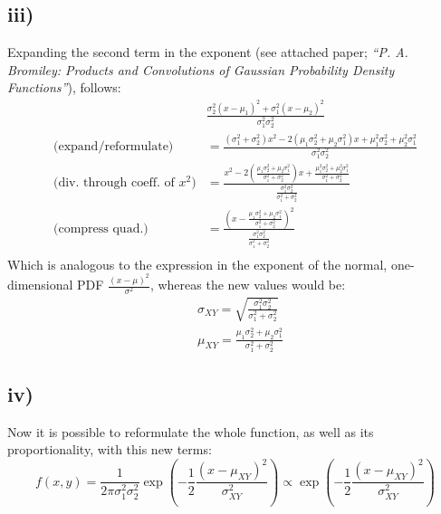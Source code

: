 \documentclass[11pt]{scrartcl} %
\begin{document}
         \subsection*{iii)}
         Expanding the second term in the exponent (see attached paper; {\it``P. A. Bromiley: Products and Convolutions of Gaussian Probability Density Functions''}), follows:
         \begin{equation}\label{eq:2}
           \begin{split}
             &\frac{\sigma_2^2(x-\mu_1)^2+\sigma_1^2(x-\mu_2)^2}{\sigma_1^2\sigma_2^2}\\
             \text{(expand/reformulate)}&=\frac{(\sigma_1^2+\sigma_2^2)x^2 -2(\mu_1\sigma_2^2+\mu_2\sigma_1^2)x+\mu_1^2\sigma_2^2+\mu_2^2\sigma_1^2}{\sigma_1^2\sigma_2^2}\\
             \text{(div. through coeff. of }x^2)&= \frac{x^2 -2(\frac{\mu_1\sigma_2^2+\mu_2\sigma_1^2}{\sigma_1^2+\sigma_2^2})x+\frac{\mu_1^2\sigma_2^2+\mu_2^2\sigma_1^2}{\sigma_1^2+\sigma_2^2}}{\frac{\sigma_1^2\sigma_2^2}{\sigma_1^2+\sigma_2^2}}\\
             \text{(compress quad.)}&= \frac{(x - \frac{\mu_1\sigma_2^2+\mu_2\sigma_1^2}{\sigma_1^2+\sigma_2^2})^2}{\frac{\sigma_1^2\sigma_2^2}{\sigma_1^2+\sigma_2^2}}\\
           \end{split}
         \end{equation}
         Which is analogous to the expression in the exponent of the normal, one-dimensional PDF \(\frac{(x-\mu)^2}{\sigma^2}\), whereas the new values would be:
         \begin{equation}\label{eq:2}
           \begin{split}
             &\sigma_{XY} = \sqrt{\frac{\sigma_1^2\sigma_2^2}{\sigma_1^2+\sigma_2^2}}\\
             &\mu_{XY} = \frac{\mu_1\sigma_2^2+\mu_2\sigma_1^2}{\sigma_1^2+\sigma_2^2}
           \end{split}
         \end{equation}
         \subsection*{iv)}
         Now it is possible to reformulate the whole function, as well as its proportionality, with this new terms:
         \begin{equation}\label{eq:1}
           f(x,y) =\frac{1}{2\pi\sigma_1^2\sigma_2^2}
           \exp\left(-\frac{1}{2}\frac{(x-\mu_{XY})^2}{\sigma_{XY}^2} \right) \propto \exp\left(-\frac{1}{2}\frac{(x-\mu_{XY})^2}{\sigma_{XY}^2} \right)
         \end{equation}
\end{document}
